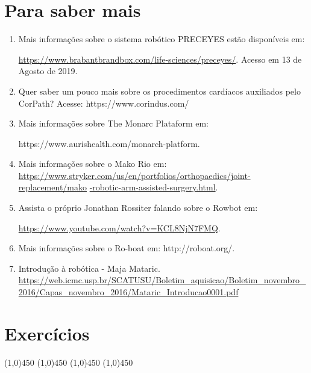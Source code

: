 \section*{Para saber mais}

\begin{enumerate}
    \item Mais informações sobre o sistema robótico PRECEYES estão disponíveis em:

    \url{https://www.brabantbrandbox.com/life-sciences/preceyes/}. Acesso em 13 de Agosto de 2019.
    
    \item Quer saber um pouco mais sobre os procedimentos cardíacos auxiliados pelo CorPath? Acesse: https://www.corindus.com/
    \item Mais informações sobre The Monarc Plataform em:


    https://www.aurishealth.com/monarch-platform.
    \item Mais informações sobre o Mako Rio em: \\
    \url{https://www.stryker.com/us/en/portfolios/orthopaedics/joint-replacement/mako}
    \url{-robotic-arm-assisted-surgery.html}.
    \item Assista o próprio Jonathan Rossiter falando sobre o Rowbot em:
    
    \url{https://www.youtube.com/watch?v=KCL8NjN7FMQ}.
    
    \item Mais informações sobre o Ro-boat em:
    http://roboat.org/.
    \item Introdução à robótica - Maja Mataric. \\
    \url{https://web.icmc.usp.br/SCATUSU/Boletim_aquisicao/Boletim_novembro_2016/Capas_novembro_2016/Mataric_Introducao0001.pdf}
\end{enumerate}

\section{Exercícios}


\begin{center}
    \line(1,0){450}
    \vspace{0.2cm}   
    \line(1,0){450}
    \vspace{0.2cm}   
    \line(1,0){450}
    \vspace{0.2cm}   
    \line(1,0){450}
    \vspace{0.2cm}   
\end{center}

